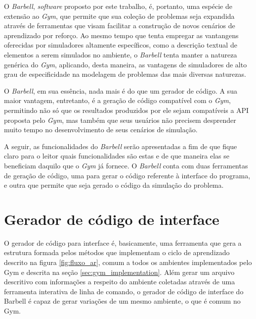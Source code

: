 \documentclass[cic,tc]{iiufrgs}
\begin{document}
O \textit{Barbell}, \textit{software} proposto por este trabalho, é, portanto,
uma espécie de extensão ao \textit{Gym}, que permite que sua coleção de
problemas seja expandida através de ferramentas que visam facilitar a construção
de novos cenários de aprendizado por reforço. Ao mesmo tempo que tenta empregar
as vantangens oferecidas por simuladores altamente específicos, como a descrição
textual de elementos a serem simulados no ambiente, o \textit{Barbell} tenta
manter a natureza genérica do \textit{Gym}, aplicando, desta maneira, as
vantagens de simuladores de alto grau de especificidade na modelagem de
problemas das mais diversas naturezas.


O \textit{Barbell}, em sua essência, nada mais é do que um gerador de código. A
sua maior vantagem, entretanto, é a geração de código compatível com o \textit{Gym},
permitindo não só que os resultados produzidos por ele sejam compatíveis a API
proposta pelo \textit{Gym}, mas também que seus usuários não precisem desprender
muito tempo no desenvolvimento de seus cenários de simulação.

A seguir, as funcionalidades do
\textit{Barbell} serão apresentadas a fim de que fique claro para o leitor
quais funcionalidades são estas e de que maneira elas se beneficiam daquilo
que o \textit{Gym} já fornece. O \textit{Barbell} conta com duas ferramentas de
geração de código, uma para gerar o código referente à interface do programa, e
outra que permite que seja gerado o código da simulação do problema.


\section{Gerador de código de interface}


O gerador de código para interface é, basicamente, uma ferramenta que gera a
estrutura formada pelos métodos que implementam o ciclo de aprendizado descrito
na figura \ref{fig:fluxo_ar}, comum a todos os ambientes implementados pelo Gym
e descrita na seção \ref{sec:gym_implementation}. Além gerar um arquivo descritivo
com informações a respeito do ambiente coletadas através de uma ferramenta
interativa de linha de comando, o gerador de código de interface do Barbell é
capaz de gerar variações de um mesmo ambiente, o que é comum no Gym.
\end{document}
